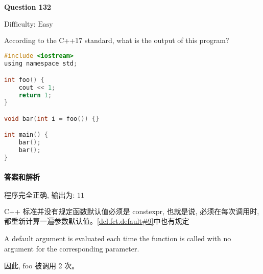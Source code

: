 \documentclass{article}
\begin{document}
	\paragraph*{Question 132} $\boxed{\text{Difficulty: Easy}} $			
	
	According to the C++17 standard, what is the output of this program?
	
	\begin{lstlisting}[language=C]  		
#include <iostream>
using namespace std;

int foo() {
	cout << 1;
	return 1;
}

void bar(int i = foo()) {}

int main() {
	bar();
	bar();
}
	\end{lstlisting}
	
	
	\paragraph*{答案和解析} $\boxed{\text{程序完全正确, 输出为: 11}} $
	
	C++ 标准并没有规定函数默认值必须是 constexpr, 也就是说, 必须在每次调用时, 都重新计算一遍参数默认值。\href{https://timsong-cpp.github.io/cppwp/n4659/dcl.fct.default#9}{[dcl.fct.default\#9]}中也有规定
	
	\begin{lightgrayleftbar}
		A default argument is evaluated each time the function is called with no argument for the corresponding parameter.
	\end{lightgrayleftbar}
	
	因此, foo 被调用 2 次。
\end{document}
